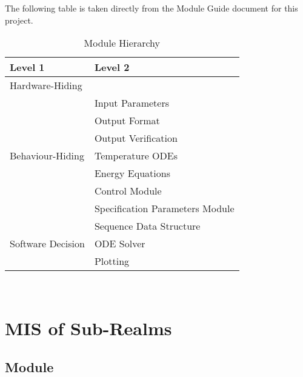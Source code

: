 \documentclass[12pt, titlepage]{article}
\begin{document}
The following table is taken directly from the Module Guide document for this project.

\begin{table}[h!]
  \centering
  \begin{tabular}{p{} p{}}
    \toprule
    \textbf{Level 1}                               & \textbf{Level 2}                \\
    \midrule

    {Hardware-Hiding}                              & ~                               \\
    \midrule

    \multirow{7}{0.3\textwidth}{Behaviour-Hiding}  & Input Parameters                \\
                                                   & Output Format                   \\
                                                   & Output Verification             \\
                                                   & Temperature ODEs                \\
                                                   & Energy Equations                \\
                                                   & Control Module                  \\
                                                   & Specification Parameters Module \\
    \midrule

    \multirow{3}{0.3\textwidth}{Software Decision} & {Sequence Data Structure}       \\
                                                   & ODE Solver                      \\
                                                   & Plotting                        \\
    \bottomrule
  \end{tabular}
  \caption{Module Hierarchy}
  \label{TblMH}
\end{table}

\newpage
~\newpage

\section{MIS of Sub-Realms} \label{sub-realms}

\subsection{Module}
\end{document}
